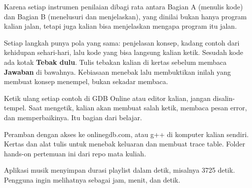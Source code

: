 \documentclass[a4paper]{article}
\begin{document}
\par\vspace{4pt}\par\vspace{6pt}
Karena setiap instrumen penilaian dibagi rata antara Bagian A (menulis kode) dan Bagian B (menelusuri dan menjelaskan), yang dinilai bukan hanya program kalian jalan, tetapi juga kalian bisa menjelaskan mengapa program itu jalan.

Setiap langkah punya pola yang sama: penjelasan konsep, kadang contoh dari kehidupan sehari-hari, lalu kode yang bisa langsung kalian ketik. Sesudah kode ada kotak \textbf{Tebak dulu}. Tulis tebakan kalian di kertas sebelum membaca \textbf{Jawaban} di bawahnya. Kebiasaan menebak lalu membuktikan inilah yang membuat konsep menempel, bukan sekadar membaca.

\begin{Penting}
Ketik ulang setiap contoh di GDB Online atau editor kalian, jangan disalin-tempel. Saat mengetik, kalian akan membuat salah ketik, membaca pesan error, dan memperbaikinya. Itu bagian dari belajar.
\end{Penting}
Peramban dengan akses ke onlinegdb.com, atau g++ di komputer kalian sendiri. Kertas dan alat tulis untuk menebak keluaran dan membuat trace table. Folder hands-on pertemuan ini dari repo mata kuliah.

Aplikasi musik menyimpan durasi playlist dalam detik, misalnya 3725 detik. Pengguna ingin melihatnya sebagai jam, menit, dan detik.
\end{document}
